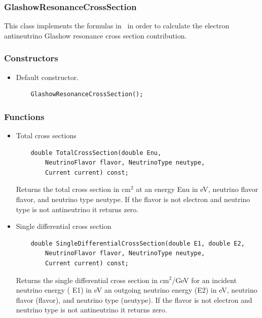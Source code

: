 \documentclass[3p,12pt]{elsarticle}
\newcommand{\ttf}{\ttfamily}
\begin{document}
\subsubsection{GlashowResonanceCrossSection\label{sec:neutrino_cross_section_glashow}}

This class implements the formulas in~\citep{GhandiReno} in order to calculate the electron antineutrino Glashow resonance cross section contribution.

\subsubsection{Constructors}

\begin{itemize}
\item Default constructor.
  \begin{lstlisting}
    GlashowResonanceCrossSection();
  \end{lstlisting}
\end{itemize}

\subsubsection{Functions}

\begin{itemize}
\item Total cross sections
  \begin{lstlisting}
    double TotalCrossSection(double Enu,
    	NeutrinoFlavor flavor, NeutrinoType neutype,
    	Current current) const;
  \end{lstlisting}
     Returns the total cross section in cm$^2$ at an energy {\ttf Enu} in eV, neutrino flavor {\ttf flavor}, and neutrino type {\ttf neutype}.
     If the flavor is not electron and neutrino type is not antineutrino it returns zero.
\item Single differential cross section
  \begin{lstlisting}
    double SingleDifferentialCrossSection(double E1, double E2,
    	NeutrinoFlavor flavor, NeutrinoType neutype,
    	Current current) const;
  \end{lstlisting}
  Returns the single differential cross section in cm$^2$/GeV for an incident neutrino energy ({\ttf
    E1}) in eV an outgoing neutrino energy ({\ttf E2}) in eV, neutrino flavor ({\ttf flavor}),
  and neutrino type ({\ttf neutype}).
     If the flavor is not electron and neutrino type is not antineutrino it returns zero.
\end{itemize}
\end{document}
